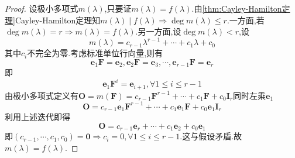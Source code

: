 {\begin{proof}
        设极小多项式$m\left(\lambda\right)$,只要证$m\left(\lambda\right)=f\left(\lambda\right)$.由\cref{thm:Cayley-Hamilton定理}Cayley-Hamilton定理知$m\left(\lambda\right)\mid f\left(\lambda\right)\Longrightarrow
            \deg m\left(\lambda\right)\leqslant r.$一方面,若$\deg m\left(\lambda\right)=r\Longrightarrow m\left(\lambda\right)=f\left(\lambda\right).$另一方面,设$\deg m\left(\lambda\right)<r$,设\[
            m\left(\lambda\right)=c_{r-1}\lambda^{r-1}+\cdots+c_1\lambda+c_0
        \]其中$c_i$不完全为零.考虑标准单位行向量,则有
        \[
            \bm{e}_1\bm{F}=\bm{e}_2,\bm{e}_2\bm{F}=\bm{e}_3,\cdots,\bm{e}_{r-1}\bm{F}=\bm{e}_r
        \]即\[
            \bm{e}_1\bm{F}^i=\bm{e}_{i+1},\forall 1\leqslant i\leqslant r-1
        \]由极小多项式定义有$\bm{O}=m\left(\bm{F}\right)=
            c_{r-1}\bm{F}^{r-1}+\cdots+c_1\bm{F}+c_0\bm{I}_r
        $同时左乘$\bm{e}_1$
        \[
            \bm{O}=c_{r-1}\bm{e}_1\bm{F}^{r-1}+\cdots+c_1\bm{e}_1\bm{F}+c_0\bm{e}_1\bm{I}_r
        \]利用上述迭代即得
        \[
            \bm{O}=c_{r-1}\bm{e}_r+\cdots+c_1\bm{e}_2+c_0\bm{e}_1
        \]即$\left(
            c_{r-1},\cdots,c_1,c_0
            \right)=\bm{0}\Longrightarrow
            c_i=0,\forall 1\leqslant i\leqslant r-1
        $.这与假设矛盾.故$m\left(\lambda\right)=f\left(\lambda\right)$.
    \end{proof}
}
